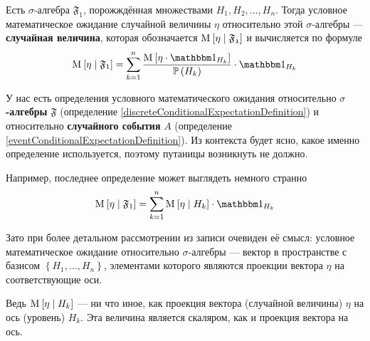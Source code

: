 \begin{definition}
  \label{discreteConditionalExpectationDefinition}
  Есть $\sigma$-алгебра $\mathfrak{F}_1$,
  порожждённая множествами $H_1, H_2, \dots, H_n$.
  Тогда условное математическое ожидание случайной величины
  $\eta$ относительно этой $\sigma$-алгебры --- \textbf{случайная величина},
  которая обозначается $\operatorname{M}_{} \left[  \eta \;\middle|\; \mathfrak{F_1}  \right]$
  и вычисляется по формуле
  $$\Mean{ \eta \mcond \mathfrak{F}_1 }
      = \sum_{k=1}^n
      \frac{\Mean{ \eta \cdot \indicatorof{H_k} }}
      {\probability{H_k}}
      \cdot \indicatorof{H_k}$$
\end{definition}

\begin{remark}
  У нас есть определения условного математического ожидания
  относительно \textbf{$\sigma$-алгебры} $\mathfrak{F}$ (определение
  \ref{discreteConditionalExpectationDefinition})
  и относительно \textbf{случайного события} $A$ (определение 
  \ref{eventConditionalExpectationDefinition}).
  Из контекста будет ясно, какое именно определение используется,
  поэтому путаницы возникнуть не должно.

  Например, последнее определение может выглядеть немного странно
  $$\Mean{ \eta \mcond \mathfrak{F}_1 }
      = \sum_{k=1}^n \Mean{ \eta \mcond H_k }
      \cdot \indicatorof{H_k}$$

  Зато при более детальном рассмотрении из записи очевиден её смысл:
  условное математическое ожидание относительно $\sigma$-алгебры --- вектор
  в пространстве с базисом $\left\{ H_1, \dots, H_n \right\}$, элементами
  которого являются проекции вектора $\eta$ на соответствующие оси.
  
  Ведь $\operatorname{M}_{} \left[  \eta \;\middle|\; H_k  \right]$ --- ни что иное, как проекция
  вектора (случайной величины) $\eta$ на ось (уровень) $H_k$.
  Эта величина является скаляром, как и проекция вектора на ось.
\end{remark}

